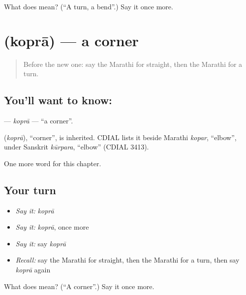 \begin{tcolorbox}[breakable,colback=teal!4,colframe=teal!35!black,title={Before you move on}]
What does  mean? (\textquotedblleft{}A turn, a bend\textquotedblright{}.) Say it once more.
\end{tcolorbox}
\section[\texorpdfstring{\mr{कोपरा} (koprā)}{कोपरा (koprā)}]{ (koprā) — a corner}

\label{lesson:MR-C127-kopra}



\begin{quote}
Before the new one: say the Marathi for straight, then the Marathi for a turn.
\end{quote}

\subsection*{You'll want to know: }
\textbf{} — \emph{koprā} — \textquotedblleft{}a corner\textquotedblright{}.

\begin{cousinweb}
\textbf{} (\emph{koprā}), \textquotedblleft{}corner\textquotedblright{}, is inherited. CDIAL lists it beside Marathi \emph{kopar}, \textquotedblleft{}elbow\textquotedblright{}, under Sanskrit \emph{kūrpara}, \textquotedblleft{}elbow\textquotedblright{} (CDIAL 3413).
\end{cousinweb}

\begin{grammarlens}[title={What you've built}]
One more word for this chapter.
\end{grammarlens}

\subsection*{Your turn}
\begin{itemize}
\raggedright
  \item \emph{Say it:} \emph{koprā}
  \item \emph{Say it:} \emph{koprā}, once more
  \item \emph{Say it:} say \emph{koprā}
  \item \emph{Recall:} say the Marathi for straight, then the Marathi for a turn, then say \emph{koprā} again
\end{itemize}

\begin{tcolorbox}[breakable,colback=teal!4,colframe=teal!35!black,title={Before you move on}]
What does  mean? (\textquotedblleft{}A corner\textquotedblright{}.) Say it once more.
\end{tcolorbox}
